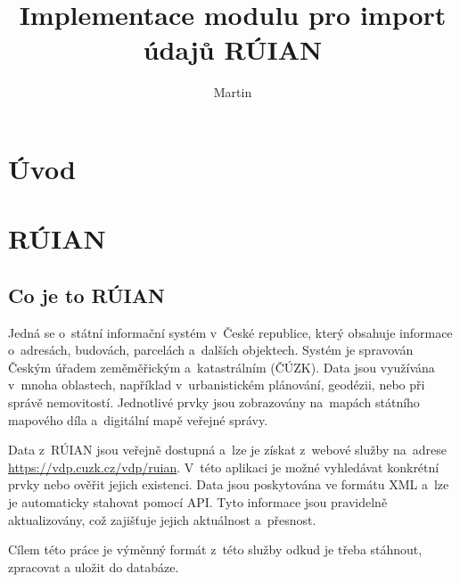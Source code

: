 \documentclass[czech, kiv, ba, he, iso690alph, pdf]{fasthesis}
\title{Implementace modulu pro import údajů RÚIAN}
\author{Martin}{Schön}{}{}
\begin{document}
\frontpages[tm]
\tableofcontents
\chapter{Úvod}

\chapter{RÚIAN}
\section{Co je to RÚIAN}
Jedná se o~státní informační systém v~České republice, který obsahuje 
informace o~adresách, budovách, parcelách a~dalších objektech. Systém 
je spravován Českým úřadem zeměměřickým a~katastrálním (ČÚZK). 
Data jsou využívána v~mnoha oblastech, například v~urbanistickém plánování, 
geodézii, nebo při správě nemovitostí. Jednotlivé prvky jsou zobrazovány na~mapách 
státního mapového díla a~digitální mapě veřejné správy.

Data z~RÚIAN jsou veřejně dostupná a~lze je získat z~webové služby na~adrese 
\url{https://vdp.cuzk.cz/vdp/ruian}. V~této aplikaci je možné vyhledávat konkrétní 
prvky nebo ověřit jejich existenci. Data jsou poskytována ve formátu XML a~lze je 
automaticky stahovat pomocí API. Tyto informace jsou pravidelně aktualizovány, 
což zajišťuje jejich aktuálnost a~přesnost.

Cílem této práce je výměnný formát z~této služby odkud je třeba stáhnout, 
zpracovat a uložit do databáze.
\end{document}
